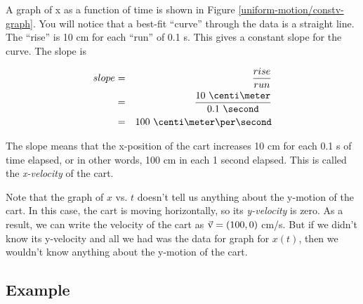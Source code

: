 A graph of x as a function of time is shown in Figure \ref{uniform-motion/constv-graph}. You will notice that a best-fit ``curve'' through the data is a straight line. The ``rise'' is 10 cm for each ``run'' of 0.1 s. This gives a constant slope for the curve. The slope is

\begin{eqnarray*}
	slope & = & \frac{rise}{run} \\
	& = & \frac{10 \ \centi\meter}{0.1\ \second} \\
	& = & 100\ \centi\meter \per \second
\end{eqnarray*}

The slope means that the x-position of the cart increases 10 cm for each 0.1 s of time elapsed, or in other words, 100 cm in each 1 second elapsed. This is called the \emph{x-velocity} of the cart. 

Note that the graph of $x$ vs. $t$ doesn't tell us anything about the y-motion of the cart. In this case, the cart is moving horizontally, so its \emph{y-velocity} is zero. As a result, we can write the velocity of the cart as  $\vec{\mathrm{v}}=(100,0)$ cm/s. But if we didn't know its y-velocity and all we had was the data for graph for $x(t)$, then we wouldn't know anything about the y-motion of the cart.


\pagebreak

\subsection*{Example}


